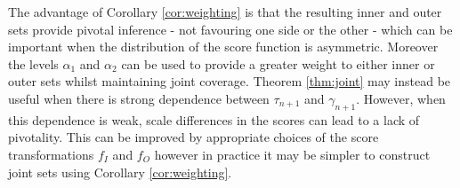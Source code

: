 \begin{remark}
	The advantage of Corollary \ref{cor:weighting} is that the resulting inner and outer sets provide pivotal inference - not favouring one side or the other - which can be important when the distribution of the score function is asymmetric. Moreover the levels $\alpha_1$ and $\alpha_2$ can be used to provide a greater weight to either inner or outer sets whilst maintaining joint coverage. Theorem \ref{thm:joint} may instead be useful when there is strong dependence between $\tau_{n+1}$ and $\gamma_{n+1}$. However, when this dependence is weak, scale differences in the scores can lead to a lack of pivotality. This can be improved by appropriate choices of the score transformations $f_I$ and $f_O$ however in practice it may be simpler to construct joint sets using Corollary \ref{cor:weighting}. 
\end{remark}

